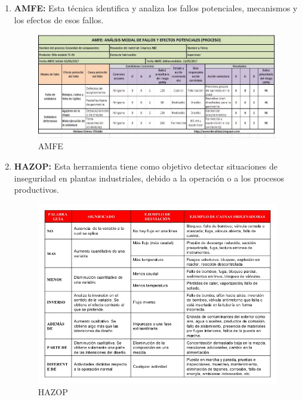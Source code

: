 \begin{enumerate}
\item {\bfseries AMFE:}
Esta técnica identifica y analiza los fallos potenciales, mecanismos y los efectos de esos fallos.
\begin{figure}[tphb]
  		   \centering
     		   \includegraphics[width=7in]{AMFE.jpg}
  		   \caption{AMFE \cite{amfe}}
  		   \label{img:amfe}
\end{figure}

\item {\bfseries HAZOP:}
Esta herramienta tiene como objetivo detectar situaciones de inseguridad en plantas industriales, debido a la operación o a los procesos productivos.
\begin{figure}[H]
  		   \centering
     		   \includegraphics[width=6in]{hazop.jpg}
  		   \caption{HAZOP \cite{hazop}}
  		   \label{img:hazop}
\end{figure}


\end{enumerate}
